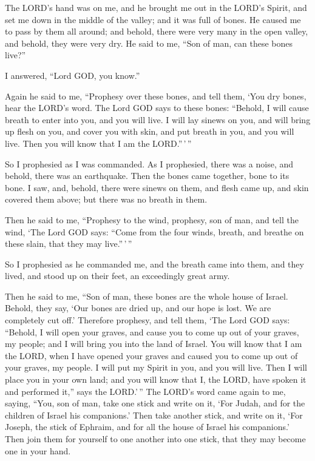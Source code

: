  The LORD's hand was on me, and he brought me out in the
LORD's Spirit, and set me down in the middle of the valley; and it was
full of bones.  He caused me to pass by them all around;
and behold, there were very many in the open valley, and behold, they
were very dry.  He said to me, ``Son of man, can these
bones live?''

I answered, ``Lord GOD, you know.''

 Again he said to me, ``Prophesy over these bones, and
tell them, `You dry bones, hear the LORD's word.  The Lord
GOD says to these bones: ``Behold, I will cause breath to enter into
you, and you will live.  I will lay sinews on you, and
will bring up flesh on you, and cover you with skin, and put breath in
you, and you will live. Then you will know that I am the LORD.''\,'\,''

 So I prophesied as I was commanded. As I prophesied,
there was a noise, and behold, there was an earthquake. Then the bones
came together, bone to its bone.  I saw, and, behold,
there were sinews on them, and flesh came up, and skin covered them
above; but there was no breath in them.

 Then he said to me, ``Prophesy to the wind, prophesy, son
of man, and tell the wind, `The Lord GOD says: ``Come from the four
winds, breath, and breathe on these slain, that they may live.''\,'\,''

 So I prophesied as he commanded me, and the breath came
into them, and they lived, and stood up on their feet, an exceedingly
great army.

 Then he said to me, ``Son of man, these bones are the
whole house of Israel. Behold, they say, `Our bones are dried up, and
our hope is lost. We are completely cut off.'  Therefore
prophesy, and tell them, `The Lord GOD says: ``Behold, I will open your
graves, and cause you to come up out of your graves, my people; and I
will bring you into the land of Israel.  You will know
that I am the LORD, when I have opened your graves and caused you to
come up out of your graves, my people.  I will put my
Spirit in you, and you will live. Then I will place you in your own
land; and you will know that I, the LORD, have spoken it and performed
it,'' says the LORD.'\,''  The LORD's word came again to
me, saying,  ``You, son of man, take one stick and write
on it, `For Judah, and for the children of Israel his companions.' Then
take another stick, and write on it, `For Joseph, the stick of Ephraim,
and for all the house of Israel his companions.'  Then
join them for yourself to one another into one stick, that they may
become one in your hand.

